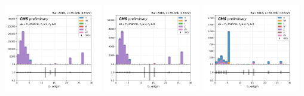 \begin{frame}{}
\begin{center}
        \includegraphics[width=0.32\textwidth]{chapters/Analysis/sectionCalibration/figures/jetToTauh/mumutau_tauGenFlavor_pickles_lltauTight.png}
        \includegraphics[width=0.32\textwidth]{chapters/Analysis/sectionCalibration/figures/jetToTauh/eetau_tauGenFlavor_pickles_lltauTight.png}
        \includegraphics[width=0.32\textwidth]{chapters/Analysis/sectionCalibration/figures/jetToTauh/emutau_tauGenFlavor_pickles_lltauTight.png}
    \end{center}
\end{frame}

